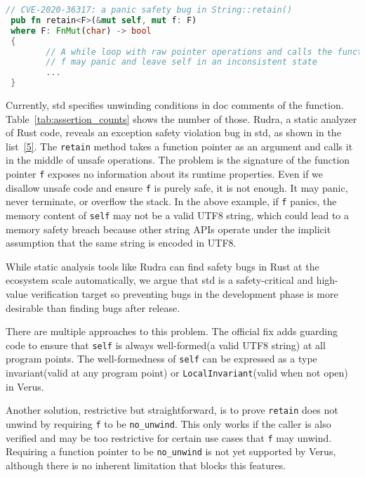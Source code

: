 \documentclass[conference]{IEEEtran}
\begin{document}
\begin{lstlisting}[language=Rust,style=colouredRust, caption={An example of exception safety violation}, label = {5}]
// CVE-2020-36317: a panic safety bug in String::retain()
 pub fn retain<F>(&mut self, mut f: F)
 where F: FnMut(char) -> bool
 {
        // A while loop with raw pointer operations and calls the function f
        // f may panic and leave self in an inconsistent state
        ...
 }
\end{lstlisting}

Currently, std specifies unwinding conditions in doc comments of the function. Table~\ref{tab:assertion_counts} shows the number of those. Rudra\cite{Rudra}, a static analyzer of Rust code, reveals an exception safety violation bug\cite{CVE-2020-36317} in std, as shown in the list~\ref{5}. The \texttt{retain} method takes a function pointer as an argument and calls it in the middle of unsafe operations. The problem is the signature of the function pointer \texttt{f} exposes no information about its runtime properties. Even if we disallow unsafe code and ensure \texttt{f} is purely safe, it is not enough. It may panic, never terminate, or overflow the stack. In the above example, if \texttt{f} panics, the memory content of \texttt{self} may not be a valid UTF8 string, which could lead to a memory safety breach because other string APIs operate under the implicit assumption that the same string is encoded in UTF8.  

While static analysis tools like Rudra can find safety bugs in Rust at the ecosystem scale automatically, we argue that std is a safety-critical and high-value verification target so preventing bugs in the development phase is more desirable than finding bugs after release. 

There are multiple approaches to this problem. The official fix adds guarding code to ensure that \texttt{self} is always well-formed(a valid UTF8 string) at all program points. The well-formedness of \texttt{self} can be expressed as a type invariant(valid at any program point) or \texttt{LocalInvariant}(valid when not open) in Verus. 

Another solution, restrictive but straightforward, is to prove \texttt{retain} does not unwind by requiring \texttt{f} to be \texttt{no\_unwind}. This only works if the caller is also verified and may be too restrictive for certain use cases that \texttt{f} may unwind. Requiring a function pointer to be \texttt{no\_unwind} is not yet supported by Verus, although there is no inherent limitation that blocks this features.   
\end{document}
